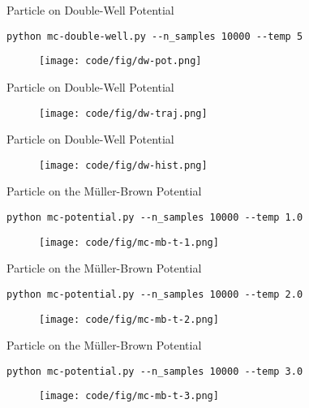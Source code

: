 \documentclass[10pt]{beamer}
\begin{document}
\begin{frame}[fragile]{Particle on Double-Well Potential}
\begin{lstlisting}
python mc-double-well.py --n_samples 10000 --temp 5
\end{lstlisting}
\vspace*{-0.3cm}
\begin{figure}
  \texttt{[image: code/fig/dw-pot.png]}
\end{figure}
\end{frame}

\begin{frame}{Particle on Double-Well Potential}
\begin{figure}
  \texttt{[image: code/fig/dw-traj.png]}
\end{figure}
\end{frame}

\begin{frame}{Particle on Double-Well Potential}
\begin{figure}
  \texttt{[image: code/fig/dw-hist.png]}
\end{figure}
\end{frame}

\begin{frame}[fragile]{Particle on the M\"uller-Brown Potential}
\begin{lstlisting}
python mc-potential.py --n_samples 10000 --temp 1.0
\end{lstlisting}
\vspace*{-0.3cm}
\begin{figure}
  \texttt{[image: code/fig/mc-mb-t-1.png]}
\end{figure}
\end{frame}

\begin{frame}[fragile]{Particle on the M\"uller-Brown Potential}
\begin{lstlisting}
python mc-potential.py --n_samples 10000 --temp 2.0
\end{lstlisting}
\vspace*{-0.3cm}
\begin{figure}
  \texttt{[image: code/fig/mc-mb-t-2.png]}
\end{figure}
\end{frame}

\begin{frame}[fragile]{Particle on the M\"uller-Brown Potential}
\begin{lstlisting}
python mc-potential.py --n_samples 10000 --temp 3.0
\end{lstlisting}
\vspace*{-0.3cm}
\begin{figure}
  \texttt{[image: code/fig/mc-mb-t-3.png]}
\end{figure}
\end{frame}
\end{document}
